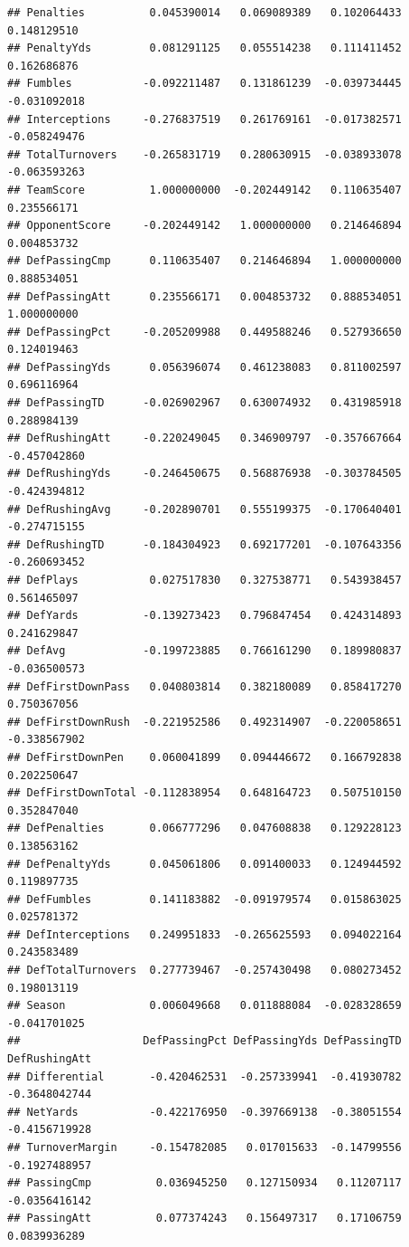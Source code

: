 \documentclass[
]{book}
\begin{document}
\begin{verbatim}
## Penalties          0.045390014   0.069089389   0.102064433   0.148129510
## PenaltyYds         0.081291125   0.055514238   0.111411452   0.162686876
## Fumbles           -0.092211487   0.131861239  -0.039734445  -0.031092018
## Interceptions     -0.276837519   0.261769161  -0.017382571  -0.058249476
## TotalTurnovers    -0.265831719   0.280630915  -0.038933078  -0.063593263
## TeamScore          1.000000000  -0.202449142   0.110635407   0.235566171
## OpponentScore     -0.202449142   1.000000000   0.214646894   0.004853732
## DefPassingCmp      0.110635407   0.214646894   1.000000000   0.888534051
## DefPassingAtt      0.235566171   0.004853732   0.888534051   1.000000000
## DefPassingPct     -0.205209988   0.449588246   0.527936650   0.124019463
## DefPassingYds      0.056396074   0.461238083   0.811002597   0.696116964
## DefPassingTD      -0.026902967   0.630074932   0.431985918   0.288984139
## DefRushingAtt     -0.220249045   0.346909797  -0.357667664  -0.457042860
## DefRushingYds     -0.246450675   0.568876938  -0.303784505  -0.424394812
## DefRushingAvg     -0.202890701   0.555199375  -0.170640401  -0.274715155
## DefRushingTD      -0.184304923   0.692177201  -0.107643356  -0.260693452
## DefPlays           0.027517830   0.327538771   0.543938457   0.561465097
## DefYards          -0.139273423   0.796847454   0.424314893   0.241629847
## DefAvg            -0.199723885   0.766161290   0.189980837  -0.036500573
## DefFirstDownPass   0.040803814   0.382180089   0.858417270   0.750367056
## DefFirstDownRush  -0.221952586   0.492314907  -0.220058651  -0.338567902
## DefFirstDownPen    0.060041899   0.094446672   0.166792838   0.202250647
## DefFirstDownTotal -0.112838954   0.648164723   0.507510150   0.352847040
## DefPenalties       0.066777296   0.047608838   0.129228123   0.138563162
## DefPenaltyYds      0.045061806   0.091400033   0.124944592   0.119897735
## DefFumbles         0.141183882  -0.091979574   0.015863025   0.025781372
## DefInterceptions   0.249951833  -0.265625593   0.094022164   0.243583489
## DefTotalTurnovers  0.277739467  -0.257430498   0.080273452   0.198013119
## Season             0.006049668   0.011888084  -0.028328659  -0.041701025
##                   DefPassingPct DefPassingYds DefPassingTD DefRushingAtt
## Differential       -0.420462531  -0.257339941  -0.41930782 -0.3648042744
## NetYards           -0.422176950  -0.397669138  -0.38051554 -0.4156719928
## TurnoverMargin     -0.154782085   0.017015633  -0.14799556 -0.1927488957
## PassingCmp          0.036945250   0.127150934   0.11207117 -0.0356416142
## PassingAtt          0.077374243   0.156497317   0.17106759  0.0839936289

\end{verbatim}
\end{document}
